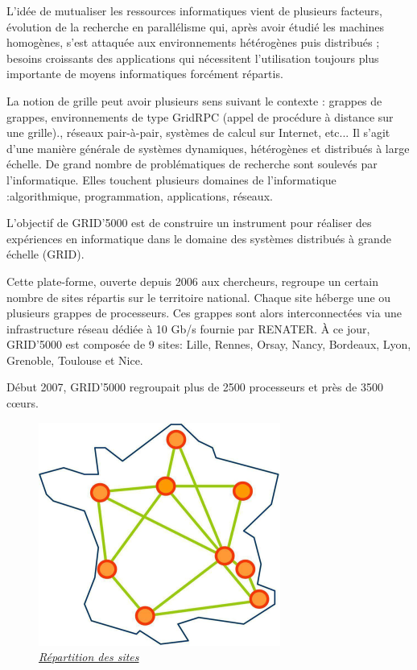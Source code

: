 L’idée de mutualiser les ressources
informatiques vient de plusieurs facteurs, évolution de la
recherche en parallélisme qui, après avoir étudié les
machines homogènes, s’est attaquée aux environnements
hétérogènes puis distribués ; besoins croissants des
applications qui nécessitent l’utilisation toujours plus
importante de moyens informatiques forcément répartis.

La notion de grille peut avoir plusieurs sens suivant le
contexte : grappes de grappes, environnements de type
GridRPC (appel de procédure à distance sur une grille).,
réseaux pair-à-pair, systèmes de calcul sur Internet, etc...
Il s’agit d’une manière générale de systèmes dynamiques,
hétérogènes et distribués à large échelle. De grand
nombre de problématiques de recherche sont soulevés
par l'informatique. Elles touchent plusieurs
domaines de l’informatique :algorithmique,
programmation, applications, réseaux.

L’objectif de GRID’5000 est de construire un instrument
pour réaliser des expériences en informatique dans le
domaine des systèmes distribués à grande échelle (GRID).

Cette plate-forme, ouverte depuis 2006 aux chercheurs, regroupe un certain nombre de sites
répartis sur le territoire national. Chaque site héberge une
ou plusieurs grappes de processeurs. Ces grappes sont
alors interconnectées via une infrastructure réseau dédiée
à 10 Gb/s fournie par RENATER. À ce jour, GRID’5000
est composée de 9 sites: Lille, Rennes, Orsay, Nancy,
Bordeaux, Lyon, Grenoble, Toulouse et Nice.

Début 2007, GRID’5000 regroupait plus de 2500 processeurs et près
de 3500 cœurs.

\newpage
\begin{figure}
\begin{center}
\includegraphics{images/g5k.png}
\\
\underline{\textit{Répartition des sites}}
\end{center}
\end{figure}



